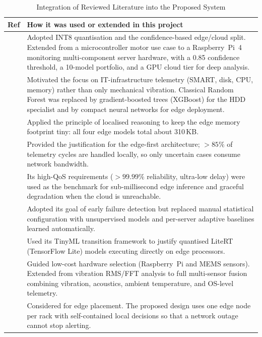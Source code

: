 \documentclass[12pt,a4paper]{report}
\begin{document}
\begin{table}[h!]
  \centering
  \caption{Integration of Reviewed Literature into the Proposed System}
  \label{tab:integration}
  \vspace*{5pt}
  \footnotesize
  \renewcommand{\arraystretch}{1.4}
  \begin{tabular}{|c|p{12.6cm}|}
    \hline
    \textbf{Ref} & \textbf{How it was used or extended in this project} \\ \hline
    [1] & Adopted INT8 quantisation and the confidence-based edge/cloud split. Extended from a microcontroller motor use case to a Raspberry~Pi~4 monitoring multi-component server hardware, with a 0.85 confidence threshold, a 10-model portfolio, and a GPU cloud tier for deep analysis. \\ \hline
    [2] & Motivated the focus on IT-infrastructure telemetry (SMART, disk, CPU, memory) rather than only mechanical vibration. Classical Random Forest was replaced by gradient-boosted trees (XGBoost) for the HDD specialist and by compact neural networks for edge deployment. \\ \hline
    [3] & Applied the principle of localised reasoning to keep the edge memory footprint tiny: all four edge models total about 310\,KB. \\ \hline
    [4] & Provided the justification for the edge-first architecture; $>85\%$ of telemetry cycles are handled locally, so only uncertain cases consume network bandwidth. \\ \hline
    [5] & Its high-QoS requirements ($>99.99\%$ reliability, ultra-low delay) were used as the benchmark for sub-millisecond edge inference and graceful degradation when the cloud is unreachable. \\ \hline
    [6] & Adopted its goal of early failure detection but replaced manual statistical configuration with unsupervised models and per-server adaptive baselines learned automatically. \\ \hline
    [7] & Used its TinyML transition framework to justify quantised LiteRT (TensorFlow Lite) models executing directly on edge processors. \\ \hline
    [8] & Guided low-cost hardware selection (Raspberry~Pi and MEMS sensors). Extended from vibration RMS/FFT analysis to full multi-sensor fusion combining vibration, acoustics, ambient temperature, and OS-level telemetry. \\ \hline
    [9] & Considered for edge placement. The proposed design uses one edge node per rack with self-contained local decisions so that a network outage cannot stop alerting. \\ \hline

\end{tabular}
\end{table}
\end{document}
